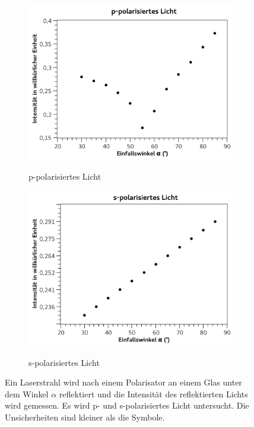 \documentclass[
	a4paper,
	12pt,
	pagesize,
	ngerman
]{scrartcl}
\begin{document}
	\begin{figure}[H]
		\centering
		\begin{subfigure}[t]{0.5\textwidth}
			\centering
			\includegraphics[width=1\textwidth]{fig_ppol}
			\label{fig_ppol}
			\caption{p-polarisiertes Licht}
		\end{subfigure}%
		\begin{subfigure}[t]{0.5\textwidth}
			\centering
			\includegraphics[width=1\textwidth]{fig_spol}
			\label{fig_spol}
			\caption{s-polarisiertes Licht}
		\end{subfigure}
		\caption{
			\label{fig_pol}%
		Ein Laserstrahl wird nach einem Polarisator an einem Glas unter dem Winkel $\alpha$ reflektiert und die Intensität des reflektierten Lichts wird gemessen. 
		Es wird p- und s-polarisiertes Licht untersucht.
		Die Unsicherheiten sind kleiner als die Symbole.}
		\centering

	\end{figure}
\end{document}
